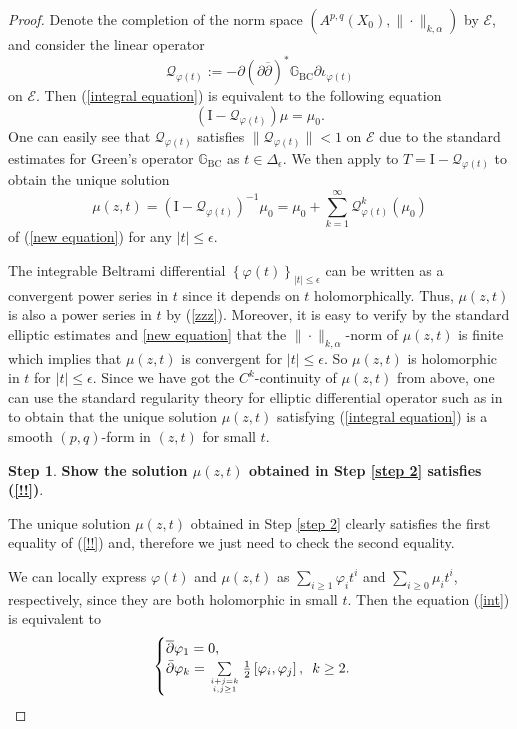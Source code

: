 \documentclass[12pt]{amsart}
\numberwithin{equation}{section}
\theoremstyle{definition}
\newtheorem{step}{Step}
\theoremstyle{definition}
\theoremstyle{definition}
\renewcommand{\1}{\mathsf{1}}
\newcommand{\G}{\mathbb{G}}
\renewcommand{\>}{\rightarrow}
\newcommand{\p}{\partial}
\newcommand{\bp}{\overline\partial}
\def\p{\partial}
\def\v{\varphi}
\theoremstyle{plain} %
\theoremstyle{plain} %
\theoremstyle{plain} %
\begin{document}
\begin{proof}
		Denote the completion of the norm space $\left(A^{p, q}(X_0),\|\cdot\|_{k, \alpha}\right)$ by $\mathscr{E}$, and consider the linear operator $$\mathcal{Q}_{\varphi(t)}:=-\p{(\p\bp)}^*\G_{\mathrm {BC}}\p \iota_{\varphi(t)}$$
		on $\mathscr{E}$. Then (\ref{integral equation}) is equivalent to the following equation
		\begin{equation}\label{new equation}
			(\mathrm{I}-\mathcal Q_{\v (t)})\mu=\mu_0.
		\end{equation}
		One can easily see that $\mathcal Q_{\v (t)}$  satisfies $\|\mathcal Q_{\v (t)}\|<1$ on $\mathscr{E}$ due to  the standard estimates for Green's operator $\G_{\mathrm {BC}}$ as $t\in \Delta_\epsilon$. We then apply \cite[Chapter \uppercase\expandafter{}.1, Theorem 2]{Yo80} to $T= \mathrm{I}-\mathcal Q_{\v (t)}$ to obtain the unique solution
		\begin{equation}\label{zzz}
			\mu(z,t)={(\mathrm{I}-\mathcal Q_{\v (t)})}^{-1}\mu_{0}=\mu_{0}+\sum^{\infty}_{k=1}\mathcal Q_{\v (t)}^k(\mu_{0})
		\end{equation}
		of (\ref{new equation}) for any $|t|\leq\epsilon.$
		
		The integrable Beltrami differential $\left\{\varphi(t)\right\}_{|t|\leq\epsilon} $  can be written as a convergent power series in $t$ since it depends on $t$ holomorphically.  Thus, $\mu(z,t)$ is also a power series in $t$ by (\ref{zzz}). Moreover, it is easy to verify by the standard elliptic estimates and \eqref{new equation} that the $\|\cdot\|_{k, \alpha}$-norm of $\mu(z,t)$ is finite which implies that $\mu(z,t)$ is convergent for $|t|\leq\epsilon$. So $\mu(z,t)$ is holomorphic in $t$ for $|t|\leq\epsilon.$
		Since we have got the $C^k$-continuity of $\mu(z,t)$ from above, one can use the standard regularity theory for elliptic differential operator such as in \cite[Proposition 2.6 of Chapter 4]{MK71} to obtain that the unique solution $\mu(z,t)$ satisfying (\ref{integral equation}) is a smooth $(p,q)$-form in $(z,t)$ for small $t$.
		\begin{step}\label{step 3}
			{\rm\textbf{Show the solution $\mu(z,t)$ obtained in Step \ref{step 2} satisfies (\ref{!!})}}.\end{step}
		The unique solution $\mu(z,t)$ obtained in Step \ref{step 2} clearly satisfies the first equality of (\ref{!!}) and,  therefore we just need to check the second equality.
		
		We can locally express $\varphi(t)$ and  $\mu(z,t)$ as $\sum_{i\geq 1}\varphi_i t^i$ and $\sum_{i\geq 0}\mu_i t^i$, respectively, since they are both holomorphic in small $t$. Then the equation (\ref{int}) is equivalent to
		\begin{equation}
			\begin{cases}\label{closedness varphi1}
				\bp \v_1=0,\\
				\bar{\partial} \varphi_{k}=\mathop\sum\limits_{i+j=k \atop i, j \geq 1} \frac{1}{2}\left[\varphi_{i}, \varphi_{j}\right], \,\,\, k\geq 2.
			\end{cases}
		\end{equation}
		

\end{proof}
\end{document}
